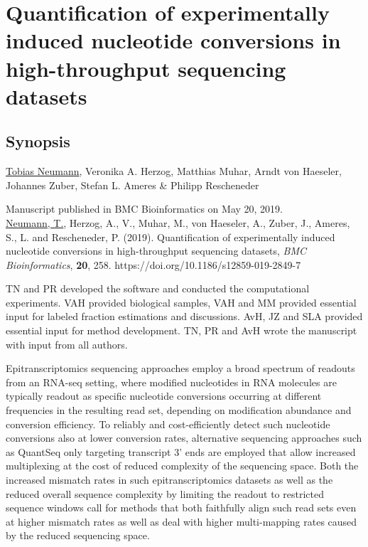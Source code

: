 
\chapter[Quantification of experimentally induced nucleotide conversions in NGS datasets]{Quantification of experimentally induced nucleotide conversions in high-throughput sequencing datasets}
\label{chap:slamdunk}

\section{Synopsis}
    
\begin{description}[style=nextline]
    \item [Authors] \underline{Tobias Neumann}, Veronika A. Herzog, Matthias Muhar, Arndt von Haeseler, Johannes Zuber, Stefan L. Ameres \& Philipp Rescheneder \vspace{0.5cm}
    \item[Manuscript status] Manuscript published in BMC Bioinformatics on May 20, 2019. \vspace{0.5cm} \\
    \underline{Neumann, T.}, Herzog, A., V., Muhar, M., von Haeseler, A., Zuber, J., Ameres, S., L. and Rescheneder, P. (2019). Quantification of experimentally induced nucleotide conversions in high-throughput sequencing datasets, \textit{BMC Bioinformatics}, \textbf{20}, 258. https://doi.org/10.1186/s12859-019-2849-7 \vspace{0.5cm}
    \item[Author contributions] TN and PR developed the software and conducted the computational experiments. VAH provided biological samples, VAH and MM provided essential input for labeled fraction estimations and discussions. AvH, JZ and SLA provided essential input for method development. TN, PR and AvH wrote the manuscript with input from all authors. 
\end{description}

Epitranscriptomics sequencing approaches employ a broad spectrum of readouts from an RNA-seq setting, where modified nucleotides in RNA molecules are typically readout as specific nucleotide conversions occurring at different frequencies in the resulting read set, depending on modification abundance and conversion efficiency. To reliably and cost-efficiently detect such nucleotide conversions also at lower conversion rates, alternative sequencing approaches such as QuantSeq only targeting transcript 3' ends are employed that allow increased multiplexing at the cost of reduced complexity of the sequencing space. Both the increased mismatch rates in such epitranscriptomics datasets as well as the reduced overall sequence complexity by limiting the readout to restricted sequence windows call for methods that both faithfully align such read sets even at higher mismatch rates as well as deal with higher multi-mapping rates caused by the reduced sequencing space. \vspace{0.5cm}

